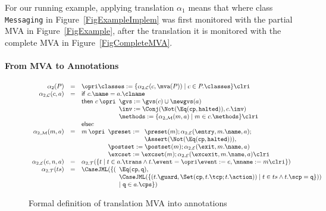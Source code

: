 For our running example, applying translation \(\alpha_1\) means that
where class \texttt{Messaging} in Figure~\ref{FigExampleImplem} was
first monitored with the partial MVA in Figure~\ref{FigExample}, after
the translation it is monitored with the complete MVA in
Figure~\ref{FigCompleteMVA}. 

\paragraph{From MVA to Annotations}

\begin{figure}[t]
\[
\begin{array}{rcl}
\alpha_2(P) & = &\opri \classes := 
\{\alpha_{2, \mathcal{C}}(c, \mva(P)) \mid c \in P.\classes\} \clri\\

\alpha_{2,\mathcal{C}}(c, a) & = &
\mathsf{if\ }c.\name = a.\clname\\
&&
\mathsf{then\ }c \:\opri 
 \begin{array}[t]{l} 
 \gvs := \gvs(c) \cup \newgvs(a)\\
 \inv := \Conj(\Not(\Eq(\texttt{cp}, \texttt{halted})), c.\inv)\\
 \methods := \{\alpha_{2,\mathcal{M}}(m, a) \mid m \in c.\methods\} \clri
\end{array}\\
&& \mathsf{else }c\\
\alpha_{2,\mathcal{M}}(m, a) & = & m \: \opri
  \begin{array}[t]{l}
  \preset := \begin{array}[t]{l}
             \preset(m); \alpha_{2,\mathcal{E}}(\entry, m.\name, a);\\
             \Assert(\Not(\Eq(\texttt{cp}, \texttt{halted}))), 
             \end{array}\\
  \postset := \postset(m); \alpha_{2, \mathcal{E}}(\exit, m.\name, a)\\
  \excset := \excset(m); \alpha_{2, \mathcal{E}}(\excexit, m.\name, a)
  \clri
  \end{array}\\
\alpha_{2, \mathcal{E}}(e, n, a) & = & 
  \alpha_{2, \mathcal{T}}(\{t \mid t \in a.\trans \wedge 
                                   t.\event = \opri \event := e,
                                                    \mname := m \clri
                           \})\\
\alpha_{2, \mathcal{T}}(ts) & = &
  \CaseJML(
    \{(\begin{array}[t]{l}
       \Eq(\texttt{cp}, \texttt{q}),\\
       \CaseJML(\{(t.\guard, \Set(\texttt{cp}, t.\tcp; t.\action)) \mid 
                  t \in ts \wedge t.\scp = \texttt{q}
               \}))\\
    \mid \texttt{q} \in a.\cps 
    \})
    \end{array}
\end{array}
\]
\caption{Formal definition of translation MVA into annotations}
\label{FigMVAtoAnnot}
\end{figure}


